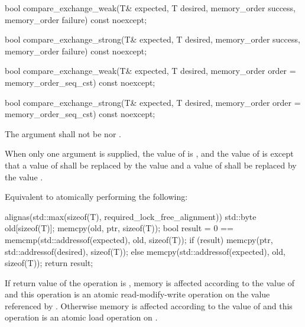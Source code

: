 \begin{itemdecl}
bool compare_exchange_weak(T& expected, T desired,
                           memory_order success, memory_order failure) const noexcept;

bool compare_exchange_strong(T& expected, T desired,
                             memory_order success, memory_order failure) const noexcept;

bool compare_exchange_weak(T& expected, T desired,
                           memory_order order = memory_order_seq_cst) const noexcept;

bool compare_exchange_strong(T& expected, T desired,
                             memory_order order = memory_order_seq_cst) const noexcept;
\end{itemdecl}

\begin{itemdescr}
\pnum
\removed{\requires}\added{\expects} The  argument shall not be
 nor .

\pnum
\effects
\begin{addedblock}
When only one  argument is supplied,
the value of  is , and
the value of  is 
except that a value of  shall be replaced by
the value  and
a value of  shall be replaced by
the value .
\end{addedblock}

\begin{addedblock}
Equivalent to atomically performing the following:
\begin{codeblock}
  alignas(std::max(sizeof(T), required_lock_free_alignment)) std::byte old[sizeof(T)];
  memcpy(old, ptr, sizeof(T));
  bool result = 0 == memcmp(std::addressof(expected), old, sizeof(T));
  if (result) memcpy(ptr, std::addressof(desired), sizeof(T));
  else memcpy(std::addressof(expected), old, sizeof(T));
  return result;
\end{codeblock}

\pnum
If return value of the operation is ,
memory is affected according to the value of  and
this operation is an atomic read-modify-write operation on
the value referenced by .
Otherwise memory is affected according to the value of  and
this operation is an atomic load operation on .
\end{addedblock}


\end{itemdescr}
